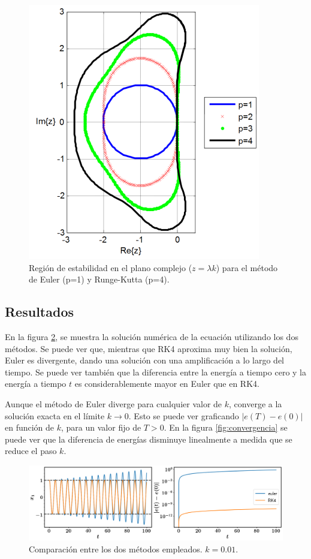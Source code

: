 \documentclass[12pt]{article}
\begin{document}
\begin{figure}
\centering
\includegraphics[scale=0.6]{EulerVsRK.png}
\caption{\label{fig:estabilidad} Regi\'on de estabilidad en el plano complejo ($z=\lambda k$) para el m\'etodo de Euler (p=1) y Runge-Kutta (p=4).}
\end{figure}

\subsection{Resultados}

En la figura \ref{fig:oscilador}, se muestra la soluci\'on num\'erica de la ecuaci\'on utilizando los dos m\'etodos. Se puede ver que, mientras que RK4 aproxima muy bien la soluci\'on, Euler es divergente, dando una soluci\'on con una amplificaci\'on a lo largo del tiempo. Se puede ver tambi\'en que la diferencia entre la energ\'ia a tiempo cero y la energ\'ia a tiempo $t$ es considerablemente mayor en Euler que en RK4.

Aunque el m\'etodo de Euler diverge para cualquier valor de $k$, converge a la soluci\'on exacta en el l\'imite $k\rightarrow 0$. Esto se puede ver graficando $|e(T)-e(0)|$ en funci\'on de $k$, para un valor fijo de $T>0$. En la figura \ref{fig:convergencia} se puede ver que la diferencia de energ\'ias disminuye linealmente a medida que se reduce el paso $k$.

\begin{figure}
\centering
\includegraphics[scale=0.33]{oscilador.png}
\caption{\label{fig:oscilador} Comparaci\'on entre los dos m\'etodos empleados. $k = 0.01$.}
\end{figure}
\end{document}
